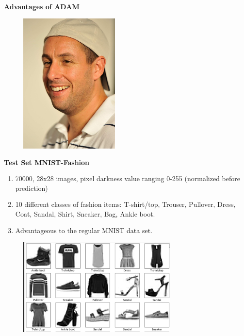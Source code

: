 \documentclass{beamer}
\newcommand\myheading[1]{%
  \par\bigskip
  {\Large\bfseries#1}\par\smallskip}
\begin{document}
\begin{frame}
    \myheading{Advantages of ADAM}
    \begin{figure}[h]
        \includegraphics[width=5cm]{presentation/ADAMS/adam_sandler.jpg}
    \end{figure}
\end{frame}

\begin{frame}
    \myheading{Test Set MNIST-Fashion}
    \begin{enumerate}
        \item 70000, 28x28 images, pixel darkness value ranging 0-255 (normalized before prediction)
        \item 10 different classes of fashion items: T-shirt/top, Trouser, Pullover, Dress, Coat,
               Sandal, Shirt, Sneaker, Bag, Ankle boot.
        \item Advantageous to the regular MNIST data set. 
    \end{enumerate}
\end{frame}

\begin{frame}
     \begin{figure}[h]
        \includegraphics[width=8cm]{report/figures/example_items.pdf}
    \end{figure}
\end{frame}
\end{document}
